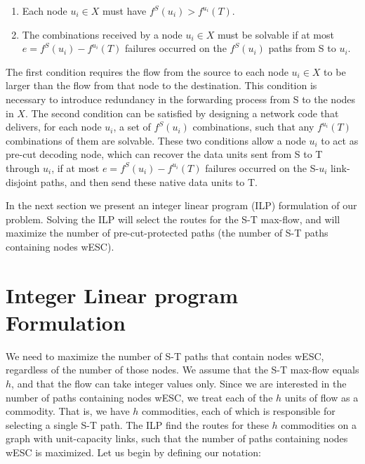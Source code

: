 \documentclass[conference]{IEEEtran}
\begin{document}
\begin{enumerate}
\item Each node $u_i \in X$ must have $f^S(u_i) > f^{u_i}(T)$. 
\item The combinations received by a node $u_i \in X$ must be solvable if at most $e = f^S(u_i) - f^{u_i}(T)$ failures occurred on the $f^S(u_i)$ paths from S to $u_i$.
\end{enumerate}


The first condition requires the flow from the source to each node $u_i \in X$ to be larger than the flow from that node to the destination. This condition is necessary to introduce redundancy in the forwarding process from S to the nodes in $X$. The second condition can be satisfied by designing a network code that delivers, for each node $u_i$, a set of $f^S(u_i)$ combinations, such that any $f^{u_i}(T)$ combinations of them are solvable. These two conditions allow a node $u_i$ to act as pre-cut decoding node, which can recover the data units sent from S to T through $u_i$, if at most $e = f^S(u_i) - f^{u_i}(T)$ failures occurred on the S-$u_i$ link-disjoint paths, and then send these native data units to T. 

In the next section we present an integer linear program (ILP) formulation of our problem. Solving the ILP will select the routes for the S-T max-flow, and will maximize the number of pre-cut-protected paths (the number of S-T paths containing nodes wESC). 

\section{Integer Linear program Formulation}
\label{Sec:ILP}

We need to maximize the number of S-T paths that contain nodes wESC, regardless of the number of those nodes. We assume that the S-T max-flow equals $h$, and that the flow can take integer values only. Since we are interested in the number of paths containing nodes wESC, we treat each of the $h$ units of flow as a commodity. That is, we have $h$ commodities, each of which is responsible for selecting a single S-T path. The ILP find the routes for these $h$ commodities on a graph with unit-capacity links, such that the number of paths containing nodes wESC is maximized. Let us begin by defining our notation:
\end{document}
